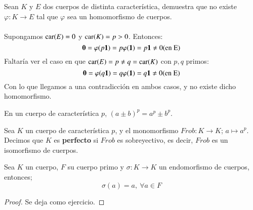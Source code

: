 \begin{ex}[H1.40]
    Sean $K$ y $E$ dos cuerpos de distinta característica, demuestra que no existe $\varphi: K \to E$ tal que $\varphi$ sea un homomorfismo de cuerpos.\\\\

    Supongamos $\mathrm{car}(E)=0$ y $\mathrm{car}(K) = p > 0$. Entonces:
    $$
        \mathbf{0} = \varphi(p \mathbf{1}) = p \varphi(\mathbf{1}) = p \mathbf{1} \neq 0 \text{(en E)}
    $$
    Faltaría ver el caso en que $\mathrm{car}(E) = p \neq q = \mathrm{car}(K)$ con $p, q$ primos:
    $$
        \mathbf{0} = \varphi(q \mathbf{1}) = q \varphi(\mathbf{1}) = q \mathbf{1} \neq 0 \text{(en E)}
    $$
    Con lo que llegamos a una contradicción en ambos casos, y no existe dicho homomorfismo.
\end{ex}

\begin{obs}
    En un cuerpo de característica $p$, $(a \pm b)^p = a^p \pm b^p$.
\end{obs}

\begin{dfn}
    Sea $K$ un cuerpo de característica $p$, y el monomorfismo $Frob: K \to K$; $a \mapsto a^p$. Decimos que $K$ es \textbf{perfecto} si $Frob$ es sobreyectivo, es decir, $Frob$ es un isomorfismo de cuerpos.
\end{dfn}

\begin{pro}
    Sea $K$ un cuerpo, $F$ su cuerpo primo y $\sigma: K \to K$ un endomorfismo de cuerpos, entonces;
    $$
        \sigma(a) = a,\ \forall a \in F
    $$
\end{pro}
\begin{proof}
    Se deja como ejercicio.
\end{proof}

